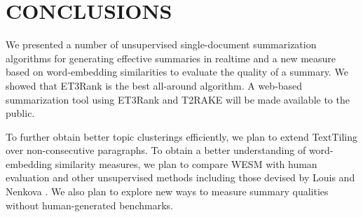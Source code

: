 \documentclass[a4paper,twoside]{article}
\begin{document}
\begin{comment}
\begin{table}[h]
\begin{center}
\begin{tabular}{l|c|c|c|c}
\hline
\bf Methods & \bf 10\% & \bf 30\% & \bf 50\% & \bf 70\% \\
\hline
\bf ET3Rank & &&& \\
ESRAKE & &&& \\
EPRAKE & &&&  \\
ET2RAKE & &&&  \\
ELDARAKE & &&&  \\
PRAKE & &&& \\
T2RAKE & &&& \\
LDARAKE & &&&\\
\hline
\end{tabular}
\caption{\label{runtime} Runtime (seconds) of different summary rate on the NewsIR-16 dataset.}
\end{center}
\end{table}

The Runtime of different summary rate on the NewsIR-16 dataset is given in Table \ref{runtime}. We can find that RAKE based summarization methods are much faster than TextRank based ones, which is bacause TextRank needs to calculate iterations until it converges while RAKE only calculates word co-occurrence. The runtime of generating summaries with different rate is similar and LDA based methods take more time.
\end{comment}

\section{\uppercase{Conclusions}}
\label{sect:conclusion}
\noindent We presented a number of unsupervised single-document summarization algorithms for generating effective summaries in realtime and
a new measure based on word-embedding similarities to evaluate the quality of a summary. We showed that ET3Rank is the best all-around algorithm. A web-based summarization tool using ET3Rank and T2RAKE will be made available to the public.

To further obtain better topic clusterings efficiently, we plan to extend TextTiling over non-consecutive paragraphs.
To obtain a better understanding of word-embedding similarity measures, we plan to compare WESM with human evaluation and
other unsupervised methods including those devised by Louis and Nenkova \cite{Louis:2009}.
We also plan to
explore new ways to measure summary qualities
without human-generated benchmarks.
\end{document}
